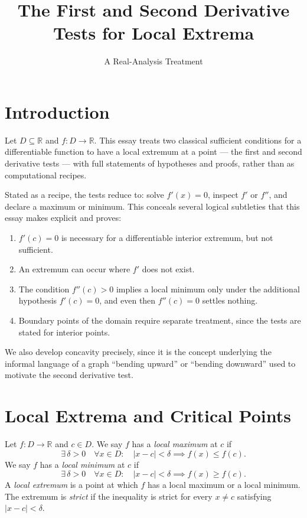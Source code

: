 \documentclass{essay}
\title{The First and Second Derivative Tests for Local Extrema}
\subtitle{A Real-Analysis Treatment}
\author{}
\date{}
\begin{document}
\maketitle

\section{Introduction}

Let \(D\subseteq\mathbb{R}\) and \(f:D\to\mathbb{R}\). This essay treats two
classical sufficient conditions for a differentiable function to have a
local extremum at a point --- the first and second derivative tests --- with
full statements of hypotheses and proofs, rather than as computational
recipes.

Stated as a recipe, the tests reduce to: solve \(f'(x)=0\), inspect \(f'\) or
\(f''\), and declare a maximum or minimum. This conceals several logical
subtleties that this essay makes explicit and proves:

\begin{enumerate}
  \item \(f'(c)=0\) is necessary for a differentiable interior extremum,
    but not sufficient.
  \item An extremum can occur where \(f'\) does not exist.
  \item The condition \(f''(c)>0\) implies a local minimum only under the
    additional hypothesis \(f'(c)=0\), and even then \(f''(c)=0\) settles
    nothing.
  \item Boundary points of the domain require separate treatment, since
    the tests are stated for interior points.
\end{enumerate}

We also develop concavity precisely, since it is the concept underlying the
informal language of a graph ``bending upward'' or ``bending downward'' used
to motivate the second derivative test.

\section{Local Extrema and Critical Points}
\label{sec:local}

\begin{definition}
  Let \(f:D\to\mathbb{R}\) and \(c\in D\). We say \(f\) has a \emph{local
  maximum} at \(c\) if
  \[ \exists\,\delta>0 \quad \forall x\in D:\quad |x-c|<\delta \implies f(x)\leq f(c). \]
  We say \(f\) has a \emph{local minimum} at \(c\) if
  \[ \exists\,\delta>0 \quad \forall x\in D:\quad |x-c|<\delta \implies f(x)\geq f(c). \]
  A \emph{local extremum} is a point at which \(f\) has a local maximum or a
  local minimum. The extremum is \emph{strict} if the inequality is strict for
  every \(x\neq c\) satisfying \(|x-c|<\delta\).
\end{definition}
\end{document}
